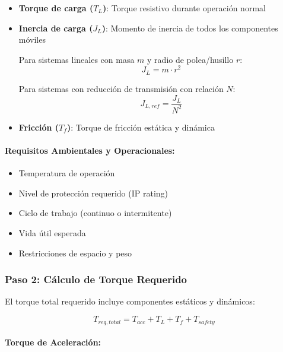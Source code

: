 \begin{itemize}
    \item \textbf{Torque de carga ($T_L$)}: Torque resistivo durante operación normal
    
    \item \textbf{Inercia de carga ($J_L$)}: Momento de inercia de todos los componentes móviles
    
    Para sistemas lineales con masa $m$ y radio de polea/husillo $r$:
    \begin{equation}
    J_L = m \cdot r^2
    \end{equation}
    
    Para sistemas con reducción de transmisión con relación $N$:
    \begin{equation}
    J_{L,ref} = \frac{J_L}{N^2}
    \end{equation}
    
    \item \textbf{Fricción ($T_f$)}: Torque de fricción estática y dinámica
\end{itemize}

\paragraph{Requisitos Ambientales y Operacionales:}

\begin{itemize}
    \item Temperatura de operación
    \item Nivel de protección requerido (IP rating)
    \item Ciclo de trabajo (continuo o intermitente)
    \item Vida útil esperada
    \item Restricciones de espacio y peso
\end{itemize}

\subsubsection{Paso 2: Cálculo de Torque Requerido}

El torque total requerido incluye componentes estáticos y dinámicos:

\begin{equation}
T_{req,total} = T_{acc} + T_L + T_f + T_{safety}
\end{equation}

\paragraph{Torque de Aceleración:}

